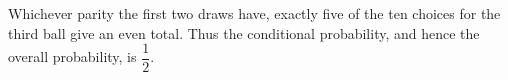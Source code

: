 Whichever parity the first two draws have, exactly five of the ten choices for the third ball give an even total. Thus the conditional probability, and hence the overall probability, is $\boxed{\dfrac{1}{2}}$.
